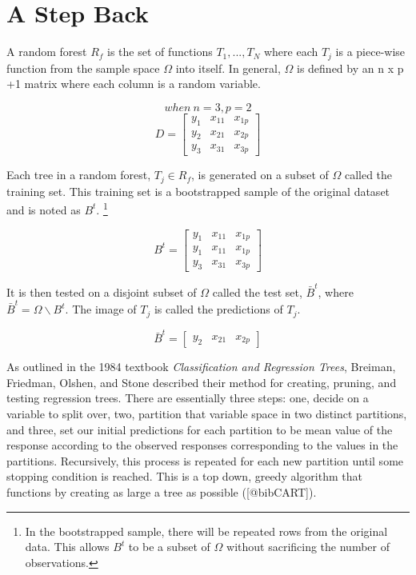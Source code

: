 \documentclass[12pt,twoside]{reedthesis}
\begin{document}
  \section{A Step Back}\label{a-step-back}
  
  A random forest \(R_f\) is the set of functions \(T_1,...,T_N\) where
  each \(T_j\) is a piece-wise function from the sample space \(\Omega\)
  into itself. In general, \(\Omega\) is defined by an n x p +1 matrix
  where each column is a random variable.
  
  \[when \ n = 3, p = 2 \] \[D = \begin{bmatrix} 
  y_{1} &  x_{11} & x_{1p}\\
  y_2  &  x_{21} & x_{2p}\\
  y_3  &  x_{31} &  x_{3p}
  \end{bmatrix}\]
  
  Each tree in a random forest, \(T_j \in R_f\), is generated on a subset
  of \(\Omega\) called the training set. This training set is a
  bootstrapped sample of the original dataset and is noted as \({B}^t\).
  \footnote{In the bootstrapped sample, there will be repeated rows from
    the original data. This allows \({B}^t\) to be a subset of \(\Omega\)
    without sacrificing the number of observations.}
  
  \[{B}^t = \begin{bmatrix} 
  y_{1} &  x_{11} & x_{1p}\\
  y_1  &  x_{11} & x_{1p}\\
  y_3  &  x_{31} &  x_{3p}
  \end{bmatrix}\]
  
  It is then tested on a disjoint subset of \(\Omega\) called the test
  set, \(\bar{B}^t\), where \(\bar{B}^t = \Omega \backslash B^t\). The
  image of \(T_j\) is called the predictions of \(T_j\).
  
  \[\bar{B}^t = \begin{bmatrix} 
  y_{2} &  x_{21} & x_{2p}
  \end{bmatrix}\]
  
  As outlined in the 1984 textbook \emph{Classification and Regression
  Trees}, Breiman, Friedman, Olshen, and Stone described their method for
  creating, pruning, and testing regression trees. There are essentially
  three steps: one, decide on a variable to split over, two, partition
  that variable space in two distinct partitions, and three, set our
  initial predictions for each partition to be mean value of the response
  according to the observed responses corresponding to the values in the
  partitions. Recursively, this process is repeated for each new partition
  until some stopping condition is reached. This is a top down, greedy
  algorithm that functions by creating as large a tree as possible
  ({[}@bibCART{]}).
  
\end{document}
